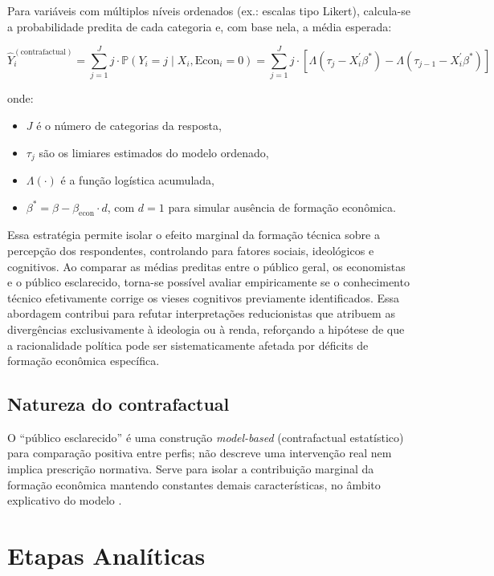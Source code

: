Para variáveis com múltiplos níveis ordenados (ex.: escalas tipo Likert), calcula-se a probabilidade predita de cada categoria e, com base nela, a média esperada:

\[
\hat{Y}_i^{(\text{contrafactual})} = \sum_{j=1}^J j \cdot \mathbb{P}(Y_i = j \mid X_i, \text{Econ}_i = 0) = \sum_{j=1}^J j \cdot \left[ \Lambda(\tau_j - X_i^\prime \beta^*) - \Lambda(\tau_{j-1} - X_i^\prime \beta^*) \right]
\]

\noindent onde:
\begin{itemize}
  \item \( J \) é o número de categorias da resposta,
  \item \( \tau_j \) são os limiares estimados do modelo ordenado,
  \item \( \Lambda(\cdot) \) é a função logística acumulada,
  \item \( \beta^* = \beta - \beta_{\text{econ}} \cdot d \), com \( d = 1 \) para simular ausência de formação econômica.
\end{itemize}

\bigskip

Essa estratégia permite isolar o efeito marginal da formação técnica sobre a percepção dos respondentes, controlando para fatores sociais, ideológicos e cognitivos. Ao comparar as médias preditas entre o público geral, os economistas e o público esclarecido, torna-se possível avaliar empiricamente se o conhecimento técnico efetivamente corrige os vieses cognitivos previamente identificados. Essa abordagem contribui para refutar interpretações reducionistas que atribuem as divergências exclusivamente à ideologia ou à renda, reforçando a hipótese de que a racionalidade política pode ser sistematicamente afetada por déficits de formação econômica específica.

\subsection{Natureza do contrafactual}
O “público esclarecido” é uma construção \textit{model-based} (contrafactual estatístico) para comparação positiva entre perfis; não descreve uma intervenção real nem implica prescrição normativa. Serve para isolar a contribuição marginal da formação econômica mantendo constantes demais características, no âmbito explicativo do modelo \cite{hausman2008}.



\section{Etapas Analíticas}

